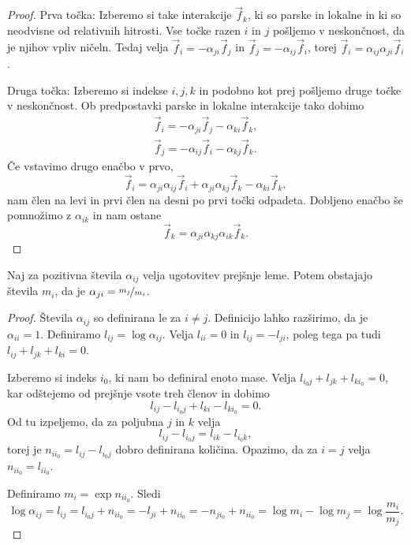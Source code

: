 \begin{proof}
  Prva točka:
  Izberemo si take interakcije $\vec{f}_k$, ki so parske in lokalne in ki so
  neodvisne od relativnih hitrosti.
  Vse točke razen $i$ in $j$ pošljemo v neskončnost, da je njihov vpliv ničeln.
  Tedaj velja $\vec{f}_i = - \alpha_{ji} \vec{f}_j$ in $\vec{f}_j = -\alpha_{ij}
  \vec{f}_i$, torej $\vec{f}_i = \alpha_{ij} \alpha_{ji} \vec{f}_i$.

  Druga točka:
  Izberemo si indekse $i, j, k$ in podobno kot prej pošljemo druge točke v
  neskončnost.
  Ob predpostavki parske in lokalne interakcije tako dobimo
  \begin{gather*}
    \vec{f}_i = - \alpha_{ji} \vec{f}_j - \alpha_{ki} \vec{f}_k, \\
    \vec{f}_j = - \alpha_{ij} \vec{f}_i - \alpha_{kj} \vec{f}_k.
  \end{gather*}
  Če vstavimo drugo enačbo v prvo,
  \[
    \vec{f}_i = \alpha_{ji} \alpha_{ij} \vec{f}_i + \alpha_{ji} \alpha_{kj}
    \vec{f}_k - \alpha_{ki} \vec{f}_k,
  \]
  nam člen na levi in prvi člen na desni po prvi točki odpadeta.
  Dobljeno enačbo še pomnožimo z $\alpha_{ik}$ in nam ostane
  \[
    \vec{f}_k = \alpha_{ji} \alpha_{kj} \alpha_{ik} \vec{f}_k.
  \]
\end{proof}

\begin{lema}
  Naj za pozitivna števila $\alpha_{ij}$ velja ugotovitev prejšnje leme.
  Potem obstajajo števila $m_i$, da je $\alpha_{ji} = \nicefrac{m_j}{m_i}$.
\end{lema}

\begin{proof}
  Števila $\alpha_{ij}$ so definirana le za $i \ne j$.
  Definicijo lahko razširimo, da je $\alpha_{ii} = 1$.
  Definiramo $l_{ij} = \log \alpha_{ij}$.
  Velja $l_{ii} = 0$ in $l_{ij} = - l_{ji}$, poleg tega pa tudi $l_{ij} + l_{jk}
  + l_{ki} = 0$.

  Izberemo si indeks $i_0$, ki nam bo definiral enoto mase.
  Velja $l_{i_0 j} + l_{jk} + l_{k i_0} = 0$, kar odštejemo od prejšnje vsote
  treh členov in dobimo
  \[
    l_{ij} - l_{i_0 j} + l_{ki} - l_{k i_0} = 0.
  \]
  Od tu izpeljemo, da za poljubna $j$ in $k$ velja
  \[
    l_{ij} - l_{i_0 j} = l_{ik} - l_{i_0 k},
  \]
  torej je $n_{i i_0} = l_{ij} - l_{i_0 j}$ dobro definirana količina.
  Opazimo, da za $i = j$ velja $n_{i i_0} = l_{i i_0}$.

  Definiramo $m_i = \exp n_{i i_0}$.
  Sledi
  \[
    \log \alpha_{ij} = l_{ij} = l_{i_0 j} + n_{i i_0} = - l_{ji} + n_{i i_0} =
    -n_{j i_0} + n_{i i_0} = \log m_i - \log m_j = \log \frac{m_i}{m_j}.
  \]
\end{proof}

